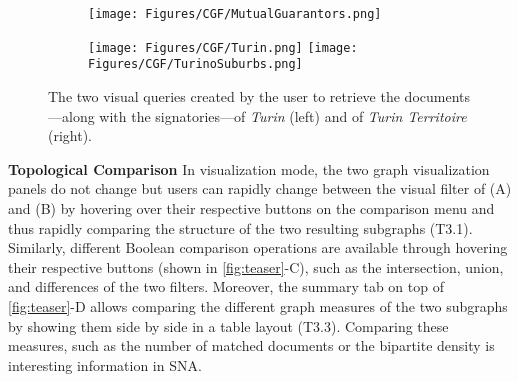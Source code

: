 
\begin{figure}
    \centering

    \begin{subfigure}{0.22\linewidth}
        \centering
        \texttt{[image: Figures/CGF/MutualGuarantors.png]}
        \caption{}
    \end{subfigure}
    \hspace{8pt}
    \begin{subfigure}{0.70\linewidth}
        \centering
        \texttt{[image: Figures/CGF/Turin.png]}
        \texttt{[image: Figures/CGF/TurinoSuburbs.png]}
        \caption{}
    \end{subfigure}

    \caption{The two visual queries created by the user to retrieve the documents---along with the signatories---of \textit{Turin} (left) and of \textit{Turin Territoire} (right).} \label{fig:visualQueriesExamples}
\end{figure}

\noindent\textbf{Topological Comparison}
In visualization mode, the two graph visualization panels do not change but users can rapidly change between the visual filter of (A) and (B) by hovering over their respective buttons on the comparison menu and thus rapidly comparing the structure of the two resulting subgraphs (T3.1). Similarly, different Boolean comparison operations are available through hovering their respective buttons (shown in \autoref{fig:teaser}-C), such as the intersection, union, and differences of the two filters. %
Moreover, the summary tab on top of \autoref{fig:teaser}-D allows comparing the different graph measures of the two subgraphs by showing them side by side in a table layout (T3.3).
Comparing these measures, such as the number of matched documents or the bipartite density is interesting information in SNA.

